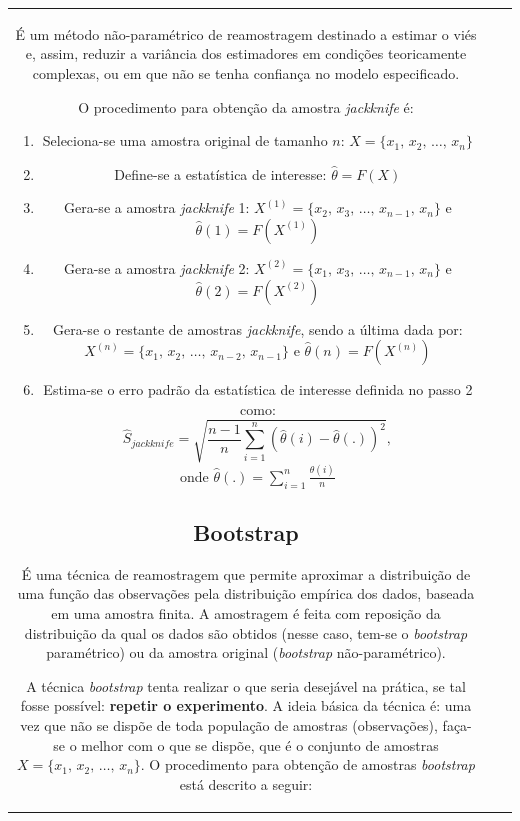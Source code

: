 \documentclass[
]{estat/estat}
\providecommand{\tightlist}{%
  \setlength{\itemsep}{0pt}\setlength{\parskip}{0pt}}\usepackage{longtable,booktabs,array}
\begin{document}
\begin{tabular}{c|cc}
É um método não-paramétrico de reamostragem destinado a estimar o viés
e, assim, reduzir a variância dos estimadores em condições teoricamente
complexas, ou em que não se tenha confiança no modelo especificado.

O procedimento para obtenção da amostra \emph{jackknife} é:

\begin{enumerate}
\def\labelenumi{\arabic{enumi}.}
\tightlist
\item
  Seleciona-se uma amostra original de tamanho \(n\):
  \(X = \{x_1, \, x_2, \, \ldots, \, x_n\}\)
\item
  Define-se a estatística de interesse: \(\hat{\theta} = F(X)\)
\item
  Gera-se a amostra \emph{jackknife} 1:
  \(X^{(1)} = \{x_2, \, x_3, \, \ldots, \, x_{n-1}, \, x_n\}\) e
  \(\hat{\theta}(1) = F(X^{(1)})\)
\item
  Gera-se a amostra \emph{jackknife} 2:
  \(X^{(2)} = \{x_1, \, x_3, \, \ldots, \, x_{n-1}, \, x_n\}\) e
  \(\hat{\theta}(2) = F(X^{(2)})\)
\item
  Gera-se o restante de amostras \emph{jackknife}, sendo a última dada
  por: \(X^{(n)} = \{x_1, \, x_2, \, \ldots, \, x_{n-2}, \, x_{n-1}\}\)
  e \(\hat{\theta}(n) = F(X^{(n)})\)
\item
  Estima-se o erro padrão da estatística de interesse definida no passo
  2 como:
  \[\hat{S}_{jackknife} = \sqrt{\frac{n-1}{n}\sum_{i=1}^{n}\left(\hat{\theta}(i)-\hat{\theta}(.)\right)^2},\]
  onde \(\hat{\theta}(.)=\sum_{i=1}^{n}\frac{\hat{\theta}(i)}{n}\)
\end{enumerate}

\hypertarget{bootstrap}{%
\subsection{Bootstrap}\label{bootstrap}}

É uma técnica de reamostragem que permite aproximar a distribuição de
uma função das observações pela distribuição empírica dos dados, baseada
em uma amostra finita. A amostragem é feita com reposição da
distribuição da qual os dados são obtidos (nesse caso, tem-se o
\emph{bootstrap} paramétrico) ou da amostra original (\emph{bootstrap}
não-paramétrico).

A técnica \emph{bootstrap} tenta realizar o que seria desejável na
prática, se tal fosse possível: \textbf{repetir o experimento}. A ideia
básica da técnica é: uma vez que não se dispõe de toda população de
amostras (observações), faça-se o melhor com o que se dispõe, que é o
conjunto de amostras \(X = \{x_1, \, x_2, \, \ldots, \, x_n\}\). O
procedimento para obtenção de amostras \emph{bootstrap} está descrito a
seguir:


\end{tabular}
\end{document}
